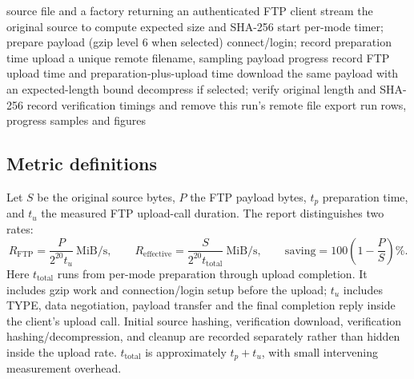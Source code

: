 \begin{algorithm}[H]\small
\caption{One original/gzip comparison}
\begin{algorithmic}[1]
\Require source file and a factory returning an authenticated FTP client
\State stream the original source to compute expected size and SHA-256
 \State start per-mode timer; prepare payload (gzip level 6 when selected)
 \State connect/login; record preparation time
 \State upload a unique remote filename, sampling payload progress
 \State record FTP upload time and preparation-plus-upload time
 \State download the same payload with an expected-length bound
 \State decompress if selected; verify original length and SHA-256
 \State record verification timings and remove this run's remote file
\EndFor
\State export run rows, progress samples and figures
\end{algorithmic}
\end{algorithm}

\subsection{Metric definitions}
Let $S$ be the original source bytes, $P$ the FTP payload bytes, $t_p$ preparation time, and $t_u$ the measured FTP upload-call duration. The report distinguishes two rates:
\[
 R_{\mathrm{FTP}}=\frac{P}{2^{20}t_u}\ \mathrm{MiB/s},\qquad
 R_{\mathrm{effective}}=\frac{S}{2^{20}t_{\mathrm{total}}}\ \mathrm{MiB/s},\qquad
 \mathrm{saving}=100\left(1-\frac{P}{S}\right)\%.
\]
Here $t_{\mathrm{total}}$ runs from per-mode preparation through upload completion. It includes gzip work and connection/login setup before the upload; $t_u$ includes TYPE, data negotiation, payload transfer and the final completion reply inside the client's upload call. Initial source hashing, verification download, verification hashing/decompression, and cleanup are recorded separately rather than hidden inside the upload rate. $t_{\mathrm{total}}$ is approximately $t_p+t_u$, with small intervening measurement overhead.

